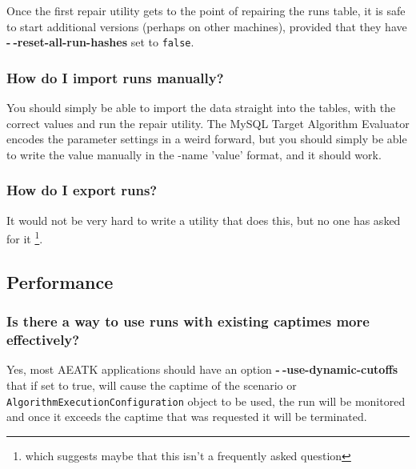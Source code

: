 \documentclass[11pt,letterpaper,oneside]{article}
\begin{document}
Once the first repair utility gets to the point of repairing the runs table, it is safe to start additional versions (perhaps on other machines), provided that they have \textbf{-$~\!$-reset-all-run-hashes} set to \texttt{false}. 

\subsubsection{How do I import runs manually?}

You should simply be able to import the data straight into the tables, with the correct values and run the repair utility. The MySQL Target Algorithm Evaluator encodes the parameter settings in a weird forward, but you should simply be able to write the value manually in the -name 'value' format, and it should work. 

\subsubsection{How do I export runs?}

It would not be very hard to write a utility that does this, but no one has asked for it \footnote{which suggests maybe that this isn't a frequently asked question}.

\subsection{Performance}

\subsubsection{Is there a way to use runs with existing captimes more effectively?}

Yes, most AEATK applications should have an option \textbf{-$~\!$-use-dynamic-cutoffs} that if set to true, will cause the captime of the scenario or \texttt{AlgorithmExecutionConfiguration} object to be used, the run will be monitored and once it exceeds the captime that was requested it will be terminated. 
\end{document}
